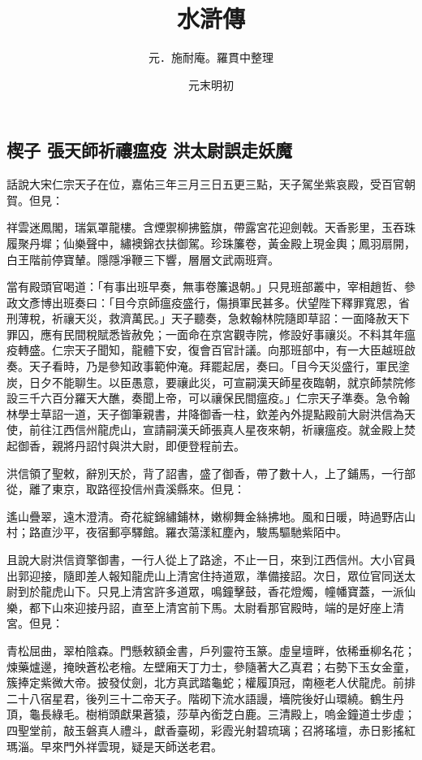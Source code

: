 \documentclass[11pt,a4paper]{article}
\title{\iyan 水滸傳}
\author{元．施耐庵。羅貫中整理}
\date{元末明初}
\begin{document}
\maketitle

\subsection{楔子 張天師祈禳瘟疫 洪太尉誤走妖魔}

話說大宋仁宗天子在位，嘉佑三年三月三日五更三點，天子駕坐紫哀殿，受百官朝賀。但見：

祥雲迷鳳閣，瑞氣罩龍樓。含煙禦柳拂籃旗，帶露宮花迎劍戟。天香影里，玉吞珠履聚丹墀；仙樂聲中，繡襖錦衣扶御駕。珍珠簾卷，黃金殿上現金輿；鳳羽扇開，白王階前停寶輦。隱隱凈鞭三下響，層層文武兩班齊。

當有殿頭官喝道：「有事出班早奏，無事卷簾退朝。」只見班部叢中，宰相趙哲、參政文彥博出班奏曰：「目今京師瘟疫盛行，傷損軍民甚多。伏望陛下釋罪寬恩，省刑薄稅，祈禳天災，救濟萬民。」天子聽奏，急敕翰林院隨即草詔：一面降赦天下罪囚，應有民間稅賦悉皆赦免；一面命在京宮觀寺院，修設好事禳災。不料其年瘟疫轉盛。仁宗天子聞知，龍體下安，復會百官計議。向那班部中，有一大臣越班啟奏。天子看時，乃是參知政事範仲淹。拜罷起居，奏曰。「目今天災盛行，軍民塗炭，日夕不能聊生。以臣愚意，要禳此災，可宣嗣漢天師星夜臨朝，就京師禁院修設三千六百分羅天大醮，奏聞上帝，可以禳保民間瘟疫。」仁宗天子準奏。急令翰林學士草詔一道，天子御筆親書，井降御香一柱，欽差內外提點殿前大尉洪信為天使，前往江西信州龍虎山，宣請嗣漢夭師張真人星夜來朝，祈禳瘟疫。就金殿上焚起御香，親將丹詔忖與洪大尉，即便登程前去。

洪信領了聖敕，辭別天於，背了詔書，盛了御香，帶了數十人，上了鋪馬，一行部從，離了東京，取路徑投信州貴溪縣來。但見：

遙山疊翠，遠木澄清。奇花綻錦繡鋪林，嫩柳舞金絲拂地。風和日暖，時過野店山村；路直沙平，夜宿郵亭驛館。羅衣蕩漾紅塵內，駿馬驅馳紫陌中。

且說大尉洪信資擎御書，一行人從上了路途，不止一日，來到江西信州。大小官員出郭迎接，隨即差人報知龍虎山上清宮住持道眾，準備接詔。次日，眾位官同送太尉到於龍虎山下。只見上清宮許多道眾，鳴鐘擊鼓，香花燈燭，幢幡寶蓋，一派仙樂，都下山來迎接丹詔，直至上清宮前下馬。太尉看那官殿時，端的是好座上清宮。但見：

青松屈曲，翠柏陰森。門懸敕額金書，戶列靈符玉篆。虛皇壇畔，依稀垂柳名花；煉藥爐邊，掩映蒼松老檜。左壁廂天丁力士，參隨著大乙真君；右勢下玉女金童，簇捧定紫微大帝。披發仗劍，北方真武踏龜蛇；權履頂冠，南極老人伏龍虎。前排二十八宿星君，後列三十二帝天子。階砌下流水語謾，墻院後好山環繞。鶴生丹頂，龜長綠毛。樹梢頭獻果蒼猿，莎草內銜芝白鹿。三清殿上，嗚金鐘道士步虛；四聖堂前，敲玉磐真人禮斗，獻香臺砌，彩霞光射碧琉璃；召將瑤壇，赤日影搖紅瑪淄。早來門外祥雲現，疑是天師送老君。
\end{document}

